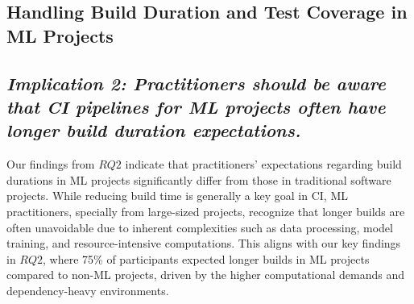 








\subsection{Handling Build Duration and Test Coverage in ML Projects}
\label{sec:handling_build_duration_and_test_cov}

\subsection*{\textit{\textbf{Implication 2: Practitioners should be aware that CI pipelines for ML projects often have longer build duration expectations.}}}

Our findings from $RQ2$ indicate that practitioners' expectations regarding build durations in ML projects significantly differ from those in traditional software projects. While reducing build time is generally a key goal in CI, ML practitioners, specially from large-sized projects, recognize that longer builds are often unavoidable due to inherent complexities such as data processing, model training, and resource-intensive computations.
This aligns with our key findings in $RQ2$, where 75\% of participants expected longer builds in ML projects compared to non-ML projects, driven by the higher computational demands and dependency-heavy environments.

